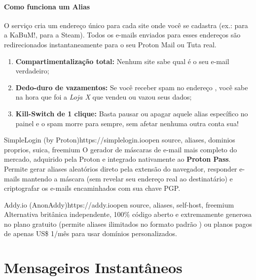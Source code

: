 \documentclass{pousadaguide}
\begin{document}
\paragraph{Como funciona um Alias}
O serviço cria um endereço único para cada site onde você se cadastra (ex.:  para a KaBuM!,  para a Steam). Todos os e-mails enviados para esses endereços são redirecionados instantaneamente para o seu Proton Mail ou Tuta real.
\begin{enumerate}
  \item \textbf{Compartimentalização total:} Nenhum site sabe qual é o seu e-mail verdadeiro;
  \item \textbf{Dedo-duro de vazamentos:} Se você receber spam no endereço , você sabe na hora que foi a \emph{Loja X} que vendeu ou vazou seus dados;
  \item \textbf{Kill-Switch de 1 clique:} Basta pausar ou apagar aquele alias específico no painel e o spam morre para sempre, sem afetar nenhuma outra conta sua!
\end{enumerate}

\begin{ferramenta}[goat,logo=simplelogin]{SimpleLogin (by Proton)}{https://simplelogin.io}{open source, aliases, dominios proprios, suica, freemium}
O gerador de máscaras de e-mail mais completo do mercado, adquirido pela Proton e integrado nativamente ao \textbf{Proton Pass}. Permite gerar aliases aleatórios direto pela extensão do navegador, responder e-mails mantendo a máscara (sem revelar seu endereço real ao destinatário) e criptografar os e-mails encaminhados com sua chave PGP. 
\end{ferramenta}

\begin{ferramenta}[goat,logo=addy]{Addy.io (AnonAddy)}{https://addy.io}{open source, aliases, self-host, freemium}
Alternativa britânica independente, 100\% código aberto e extremamente generosa no plano gratuito (permite aliases ilimitados no formato padrão ) ou planos pagos de apenas US\$ 1/mês para usar domínios personalizados. 
\end{ferramenta}

\section{Mensageiros Instantâneos}
\end{document}
